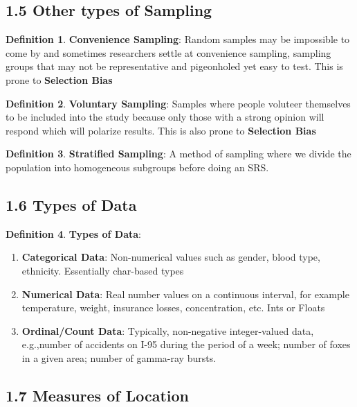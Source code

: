 \documentclass[12pt]{amsart}
\theoremstyle{definition}
\newtheorem{definition}{Definition} %
\numberwithin{equation}{theorem}    %
\begin{document}
\subsection*{1.5 Other types of Sampling}

\begin{definition}
    \textbf{Convenience Sampling}:
    Random samples may be impossible to come by and sometimes researchers settle at convenience sampling, sampling groups that may not be representative and pigeonholed yet easy to test. This is prone to \textbf{Selection Bias}
\end{definition}

\begin{definition}
    \textbf{Voluntary Sampling}:
    Samples where people voluteer themselves to be included into the study because only those with a strong opinion will respond which will polarize results. This is also prone to \textbf{Selection Bias}
\end{definition}

\begin{definition}
    \textbf{Stratified Sampling}:
    A method of sampling where we divide the population into homogeneous subgroups before doing an SRS. 
\end{definition}

\subsection*{1.6 Types of Data}

\begin{definition}
    \textbf{Types of Data}:
    \begin{enumerate}
        \item \textbf{Categorical Data}:
        Non-numerical values such as gender, blood type, ethnicity. Essentially char-based types 
        \item \textbf{Numerical Data}:
        Real number values on a continuous interval, for example temperature, weight, insurance losses, concentration, etc. Ints or Floats
        \item \textbf{Ordinal/Count Data}:
        Typically, non-negative integer-valued data, e.g.,number of accidents on I-95 during the period of a week; number of foxes in a given area; number of gamma-ray bursts.
    \end{enumerate}
\end{definition}

\subsection*{1.7 Measures of Location}
\end{document}
